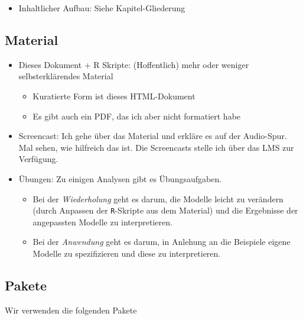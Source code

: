 \documentclass[]{book}
\providecommand{\tightlist}{%
  \setlength{\itemsep}{0pt}\setlength{\parskip}{0pt}}
\begin{document}
\begin{itemize}
\tightlist
\item
  Inhaltlicher Aufbau: Siehe Kapitel-Gliederung
\end{itemize}

\hypertarget{material}{%
\subsection*{Material}\label{material}}

\begin{itemize}
\item
  Dieses Dokument + R Skripte: (Hoffentlich) mehr oder weniger selbsterklärendes Material

  \begin{itemize}
  \tightlist
  \item
    Kuratierte Form ist dieses HTML-Dokument
  \item
    Es gibt auch ein PDF, das ich aber nicht formatiert habe
  \end{itemize}
\item
  Screencast: Ich gehe über das Material und erkläre es auf der Audio-Spur. Mal sehen, wie hilfreich das ist. Die Screencasts stelle ich über das LMS zur Verfügung.
\item
  Übungen: Zu einigen Analysen gibt es Übungsaufgaben.

  \begin{itemize}
  \tightlist
  \item
    Bei der \emph{Wiederholung} geht es darum, die Modelle leicht zu verändern (durch Anpassen der \texttt{R}-Skripte aus dem Material) und die Ergebnisse der angepassten Modelle zu interpretieren.
  \item
    Bei der \emph{Anwendung} geht es darum, in Anlehung an die Beispiele eigene Modelle zu spezifizieren und diese zu interpretieren.
  \end{itemize}
\end{itemize}

\hypertarget{pakete}{%
\subsection*{Pakete}\label{pakete}}

Wir verwenden die folgenden Pakete
\end{document}
